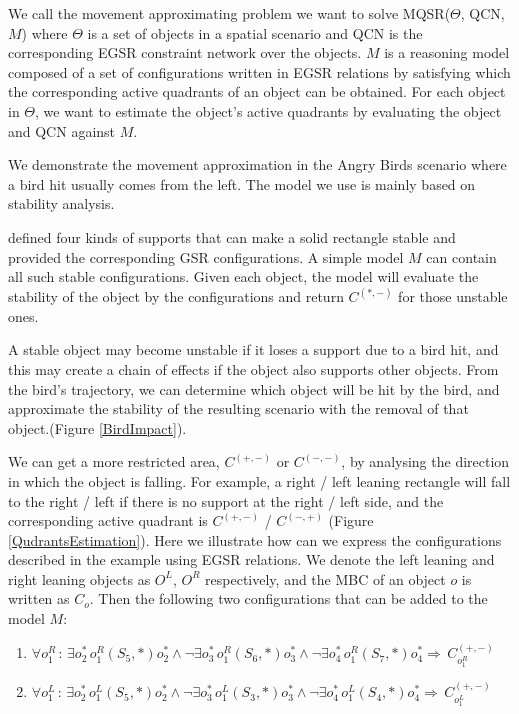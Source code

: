 \documentclass[letterpaper]{article}
\begin{document}
We call the movement approximating problem we want to solve MQSR($\Theta$, QCN, $M$) where $\Theta$ is a set of objects in a spatial scenario and QCN is the corresponding EGSR constraint network over the objects. $M$ is a reasoning 
model composed of a set of configurations written in EGSR relations by satisfying which the corresponding active quadrants of an object can be obtained. For each object in $\Theta$, we want to estimate the object's active quadrants by evaluating the object and QCN against $M$.

We demonstrate the movement approximation in the Angry Birds scenario where a bird hit usually comes from the left. The model we use is mainly based on stability analysis.

\cite{Ge2013} defined four kinds of supports that can make a solid rectangle stable and provided the corresponding GSR configurations. A simple model $M$ can contain all such stable configurations. Given each object, the model will evaluate the stability of the object by the configurations and return $C^{(*,-)}$ for those unstable ones. 

A stable object may become unstable if it loses a support due to a bird hit, and this may create a chain of effects if the object also supports other objects. From the bird's trajectory, we can determine which object will be hit by the bird, and approximate the stability of the resulting scenario with the removal of that object.(Figure \ref{BirdImpact}). 

We can get a more restricted area, $C^{(+,-)}$ or $C^{(-,-)}$, by analysing the direction in which the object is falling. For example, a right / left leaning rectangle will fall to the right / left if there is no support at the right / left side, and the corresponding active quadrant is $C^{(+,-)}$ / $C^{(-, +)}$ (Figure \ref{QudrantsEstimation}). Here we illustrate how can we express the configurations described in the example using EGSR relations. We denote the left leaning and right leaning objects as $O^L$, $O^R$ respectively, and the MBC of an object $o$ is written as $C_{o}$. Then the following two configurations that can be added to the model $M$:
\begin{enumerate}
\item $\forall o^R_1\,:\, \exists o^*_2\,o^R_1 (S_5, *) o^*_2 \wedge\neg\exists o^*_3\,o^R_1 (S_6, *) o^*_3 \wedge\neg\exists o^*_4\,o^R_1 (S_7, *) o^*_4 \Rightarrow \, C_{o^R_1}^{(+,-)}$

\item $\forall o^L_1\,:\, \exists o^*_2\,o^L_1 (S_5, *) o^*_2 \wedge\neg\exists o^*_3\,o^L_1 (S_3, *) o^*_3 \wedge\neg\exists o^*_4\,o^L_1 (S_4, *) o^*_4 \Rightarrow \, C_{o^L_1}^{(+,-)}$
\end{enumerate}
\end{document}
